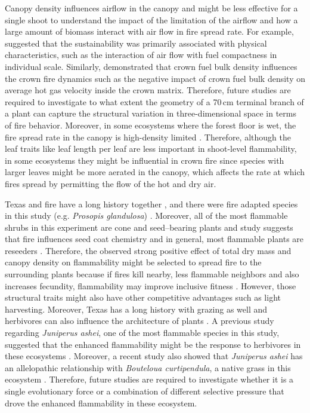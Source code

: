 \documentclass{bmcart}
\begin{document}
Canopy density influences airflow in the canopy \citep{cionco1978analysis} and might be less effective for a single shoot to understand the impact of the limitation of the airflow and how a large amount of biomass interact with air flow in fire spread rate. For example, \citet{madrigal2012evaluation} suggested that the sustainability was primarily associated with physical characteristics, such as the interaction of air flow with fuel compactness in individual scale. Similarly, \citet{tachajapong2008investigation} demonstrated that crown fuel bulk density influences the crown fire dynamics such as the negative impact of crown fuel bulk density on average hot gas velocity inside the crown matrix.
Therefore, future studies are required to investigate to what extent the geometry of a 70\,cm terminal branch of a plant can capture the structural variation in three-dimensional space in terms of fire behavior. Moreover, in some ecosystems where the forest floor is wet, the fire spread rate in the canopy is high-density limited  \citep{ray2005micrometeorological}. Therefore, although the leaf traits like leaf length per leaf are less important in shoot-level flammability, in some ecosystems they might be influential in crown fire since species with larger leaves might be more aerated in the canopy, which affects the rate at which fires spread by permitting the flow of the hot and dry air. 

Texas and fire have a long history together \citep{moir1982firehistory, stambaugh2011firehistory,stambaugh2014historicalfirehistory,smeins2005historyoffire1}, and there were fire adapted species in this study (e.g. \emph{Prosopis glandulosa}) \citep{wright1976effect}. 
Moreover, all of the most flammable shrubs in this experiment are cone and seed--bearing plants 
and study suggests that fire influences seed coat chemistry \citep{mcinnes2022doesseedcoatchemistry} and in general, most flammable plants are reseeders \citep{midgley2011pushingreseeders}. Therefore,  the observed strong positive effect of total dry mass  and canopy density on flammability might be selected to spread fire to the surrounding plants because if fires kill nearby, less flammable neighbors and also increases fecundity, flammability may improve inclusive fitness \citep{bond1995kill}. However, those structural traits might also have other competitive advantages such as light harvesting. Moreover, Texas has a long history with grazing as well and herbivores can also influence the architecture of plants \citep{danell1994browseeffects}. A previous study regarding \emph{Juniperus ashei}, one of the most flammable species in this study, suggested that the enhanced flammability might be the response to herbivores in these ecosystems \citep{owens1998seasonal}. Moreover, a recent study also showed that \emph{Juniperus ashei} has an allelopathic relationship with \emph{Bouteloua curtipendula}, a native grass in this ecosystem \citep{young2009assessmentallelopathy}. Therefore, future studies are required to investigate whether it is a single evolutionary force or a combination of different selective pressure that drove the enhanced flammability in these ecosystem.
\end{document}
